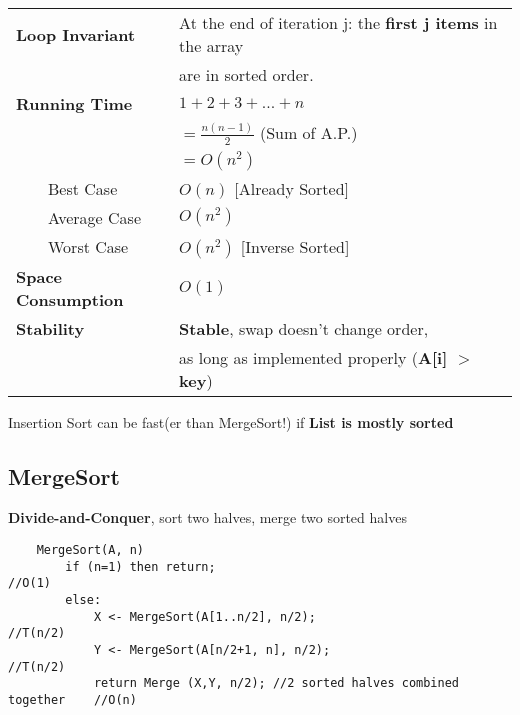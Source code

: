 \documentclass{article}
\newcommand{\tabitem}{~~\llap{\textbullet}~~}
\begin{document}
    \begin{tabular}{ll}
        \toprule
        \textbf{Loop Invariant} & At the end of iteration j: the \textbf{first j items} in the array \\
        &  are in sorted order.\\
        \midrule
        \textbf{Running Time} & $1 + 2 + 3 + ... + n$\\
        & $ = \frac{n(n-1)}{2}$ (Sum of A.P.)\\
        & $ = O(n^{2})$\\
        \tabitem Best Case & $O(n)$ [Already Sorted]\\
        \tabitem Average Case & $O(n^{2})$\\
        \tabitem Worst Case & $O(n^{2})$ [Inverse Sorted]\\
        \midrule
        \textbf{Space Consumption} & $O(1)$\\
        \midrule
        \textbf{Stability} & \textbf{Stable}, swap doesn't change order, \\
        & as long as implemented properly (\textbf{A[i] $>$ key})\\
        \bottomrule
    \end{tabular}

    \bigskip

    Insertion Sort can be fast(er than MergeSort!) if \textbf{List is mostly sorted}


    \subsection{MergeSort}

    \textbf{Divide-and-Conquer}, sort two halves, merge two sorted halves

    \begin{verbatim}
    MergeSort(A, n)
        if (n=1) then return;                                               //O(1)
        else:           
            X <- MergeSort(A[1..n/2], n/2);                                 //T(n/2)
            Y <- MergeSort(A[n/2+1, n], n/2);                               //T(n/2)
            return Merge (X,Y, n/2); //2 sorted halves combined together    //O(n)
    \end{verbatim}
    
\end{document}
